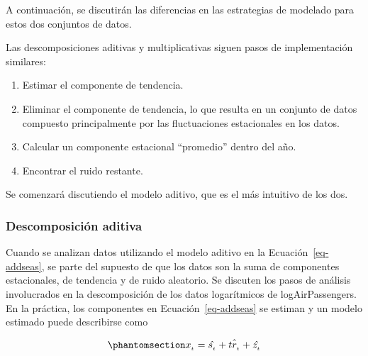 \documentclass[
  us-letterpaper,
]{scrreprt}
\providecommand{\tightlist}{%
  \setlength{\itemsep}{0pt}\setlength{\parskip}{0pt}}\usepackage{longtable,booktabs,array}
\theoremstyle{definition}
\theoremstyle{plain}
\theoremstyle{plain}
\theoremstyle{definition}
\theoremstyle{remark}
\begin{document}
A continuación, se discutirán las diferencias en las estrategias de
modelado para estos dos conjuntos de datos.

Las descomposiciones aditivas y multiplicativas siguen pasos de
implementación similares:

\begin{enumerate}
\def\labelenumi{\arabic{enumi}.}
\tightlist
\item
  Estimar el componente de tendencia.
\item
  Eliminar el componente de tendencia, lo que resulta en un conjunto de
  datos compuesto principalmente por las fluctuaciones estacionales en
  los datos.
\item
  Calcular un componente estacional ``promedio'' dentro del año.
\item
  Encontrar el ruido restante.
\end{enumerate}

Se comenzará discutiendo el modelo aditivo, que es el más intuitivo de
los dos.

\subsubsection{Descomposición aditiva}\label{descomposiciuxf3n-aditiva}

Cuando se analizan datos utilizando el modelo aditivo en la
Ecuación~\ref{eq-addseas}, se parte del supuesto de que los datos son la
suma de componentes estacionales, de tendencia y de ruido aleatorio. Se
discuten los pasos de análisis involucrados en la descomposición de los
datos logarítmicos de logAirPassengers. En la práctica, los componentes
en Ecuación~\ref{eq-addseas} se estiman y un modelo estimado puede
describirse como

\begin{equation}\phantomsection\label{eq-addecompose}{
x_{_t}=\hat{s_{_t}}+\hat{tr_{_t}}+\hat{z_{_t}}
}\end{equation}
\end{document}

